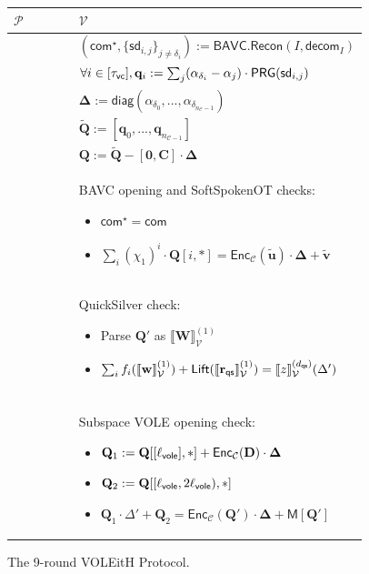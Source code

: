 \documentclass[11pt,a4paper]{article}
\theoremstyle{definition}
\theoremstyle{remark}
\newcommand{\calC}{\mathcal{C}}
\newcommand{\itmacV}[1]{\llbracket {#1} \rrbracket_{\calV}}
\newcommand{\calP}{\mathcal{P}}
\newcommand{\calV}{\mathcal{V}}
\newcommand{\mat}[1]{\mathbf{#1}}
\renewcommand{\vec}[1]{\mathbf{#1}}
\begin{document}
\begin{figure}[h]
	\centering
	\begin{tabular}{p{0.2\linewidth}>{\centering\arraybackslash}p{0.15\linewidth}p{0.57\linewidth}}
		\toprule
		$\calP$ & & $\calV$ \\
		\midrule
		& & $(\mathsf{com}^{\star}, \{\mathsf{sd}_{i,j}\}_{j \neq \delta_i}) := \mathsf{BAVC.Recon}({I}, \mathsf{decom}_{{I}})$ \\
		& & $\forall i \in [\tau_{\sf vc}], \vec{q}_i := \sum_j (\alpha_{\delta_i} - \alpha_j) \cdot \mathsf{PRG}(\mathsf{sd}_{i, j})$ \\
		& & $\mat{\Delta} := \mathsf{diag}(\alpha_{\delta_0}, ..., \alpha_{\delta_{n_{\calC} - 1}}) $ \\
		& & $\widetilde{\mat{Q}} := [\vec{q}_0, ..., \vec{q}_{n_{\calC - 1}}]$ \\
		& & $\mat{Q} := \widetilde{\mat{Q}} - [\mat{0}, \mat{C}] \cdot \mat{\Delta}  $ \\
		& & BAVC opening and SoftSpokenOT checks: 
		\begin{itemize}
			\item $\mathsf{com}^{\star} = \mathsf{com}$
			\item $\sum_{i} (\chi_1)^{i} \cdot \mat{Q}[i, *] = \mathsf{Enc}_{\calC}(\tilde{\vec{u}}) \cdot \mat{\Delta} + \tilde{\vec{v}}$
		\end{itemize} \\
		& & QuickSilver check:
		\begin{itemize}
			\item Parse $\mat{Q}'$ as $\itmacV{\mat{W}}^{(1)}$
			\item $\sum_{i} f_i (\itmacV{\vec{w}}^{(1)}) + \mathsf{Lift}(\itmacV{\vec{r}_{\sf qs}}^{(1)}) = \itmacV{z}^{(d_{\sf qs})}(\Delta')$
		\end{itemize} \\
		& &  \\
		& & Subspace VOLE opening check:
		\begin{itemize}
			\item $\mat{Q}_1 := \mat{Q}[[\ell_{\sf vole}], *] + \mathsf{Enc}_{\calC}(\mat{D}) \cdot \mat{\Delta}$
			\item $\mat{Q}_2 := \mat{Q}[[\ell_{\sf vole}, 2\ell_{\sf vole}), *]$
			\item $\mat{Q}_1 \cdot \Delta' + \mat{Q}_2 = \mathsf{Enc}_{\calC}(\mat{Q}') \cdot \mat{\Delta} + \mathsf{M}[\mat{Q}']$
		\end{itemize} \\
		\bottomrule
	\end{tabular}

	\caption{The 9-round VOLEitH Protocol.}
	\label{fig:9-round-voleith-2}
\end{figure}
\end{document}
